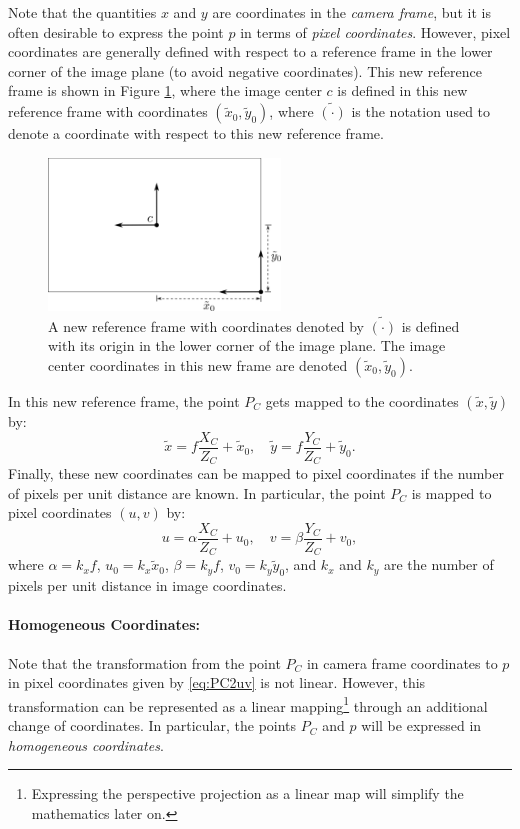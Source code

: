 Note that the quantities $x$ and $y$ are coordinates in the \textit{camera frame}, but it is often desirable to express the point $p$ in terms of \textit{pixel coordinates}. However, pixel coordinates are generally defined with respect to a reference frame in the lower corner of the image plane (to avoid negative coordinates). This new reference frame is shown in Figure \ref{fig:camera_coordinates}, where the image center $c$ is defined in this new reference frame with coordinates $(\tilde{x}_0, \tilde{y}_0)$, where $\tilde{(\cdot)}$ is the notation used to denote a coordinate with respect to this new reference frame.
\begin{figure}[ht]
\includegraphics[width=0.55\textwidth]{tex/figs/ch08_figs/imageframe.png}
\centering
\caption{A new reference frame with coordinates denoted by $\tilde{(\cdot)}$  is defined with its origin in the lower corner of the image plane. The image center coordinates in this new frame are denoted $(\tilde{x}_0, \tilde{y}_0)$.}
\label{fig:camera_coordinates}
\end{figure}
In this new reference frame, the point $P_C$ gets mapped to the coordinates $(\tilde{x}, \tilde{y})$ by:
\begin{equation} \label{eq:PC2xtyt}
    \tilde{x} = f\frac{X_C}{Z_C} + \tilde{x}_0, \quad  \tilde{y} = f\frac{Y_C}{Z_C} + \tilde{y}_0.
\end{equation}
Finally, these new coordinates can be mapped to pixel coordinates if the number of pixels per unit distance are known. In particular, the point $P_C$ is mapped to pixel coordinates $(u,v)$ by:
\begin{equation} \label{eq:PC2uv}
   u = \alpha \frac{X_C}{Z_C} + u_0, \quad  v = \beta \frac{Y_C}{Z_C} + v_0,
\end{equation}
where $\alpha = k_xf$, $u_0 = k_x \tilde{x}_0$, $\beta = k_y f$, $v_0 = k_y \tilde{y}_0$, and $k_x$ and $k_y$ are the number of pixels per unit distance in image coordinates.

\paragraph{Homogeneous Coordinates:}
Note that the transformation from the point $P_C$ in camera frame coordinates to $p$ in pixel coordinates given by \eqref{eq:PC2uv} is not linear. However, this transformation can be represented as a linear mapping\footnote{Expressing the perspective projection as a linear map will simplify the mathematics later on.} through an additional change of coordinates. In particular, the points $P_C$ and $p$ will be expressed in \textit{homogeneous coordinates}.

